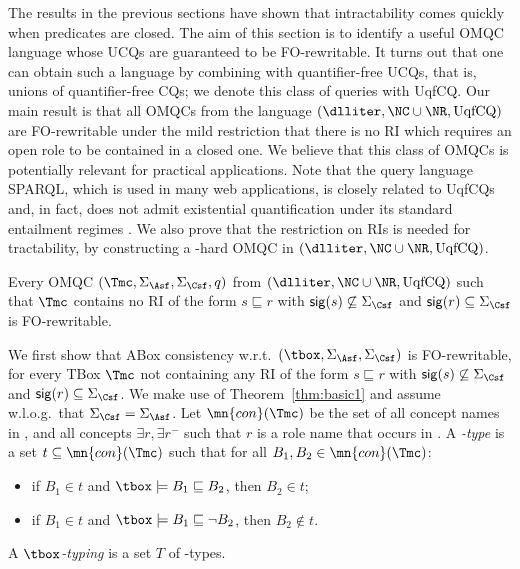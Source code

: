 \documentclass{lmcs}
\theoremstyle{definition}
\begin{document}
The results in the previous sections have shown that intractability
comes quickly when predicates are closed. The aim of this section is
to identify a useful OMQC language whose UCQs are guaranteed to be
FO-rewritable. It turns out that one can obtain such a language by
combining \dlliter with quantifier-free UCQs, that is, unions of
quantifier-free CQs; we denote this class of queries with UqfCQ. Our
main result is that all OMQCs from the language
$(\dlliter,\NC \cup \NR,\text{UqfCQ})$ are FO-rewritable under the
mild restriction that there is no RI which requires an open role to be
contained in a closed one. We believe that this class of OMQCs is
potentially relevant for practical applications. Note that the query
language SPARQL, which is used in many web applications, is closely
related to UqfCQs and, in fact, does not admit existential
quantification under its standard entailment regimes
\cite{DBLP:conf/semweb/GlimmK10}. We also prove that the restriction
on RIs is needed for tractability, by constructing a \conp-hard OMQC
in $(\dlliter,\NC \cup \NR,\text{UqfCQ})$.
%
\begin{thm}
  \label{thm:rewr}
  Every OMQC $(\Tmc,\Sigma_{\Asf},\Sigma_{\Csf},q)$ from
  $(\dlliter,\NC \cup \NR,\text{UqfCQ})$ such that
  $\Tmc$ contains no RI of the form $s \sqsubseteq r $
  with ${\sf sig}(s)\not\subseteq\Sigma_{\Csf}$ and ${\sf sig}(r)\subseteq \Sigma_{\Csf}$ is
  FO-rewritable.
\end{thm}
%
We first show that ABox consistency w.r.t.\ 
$(\tbox,\Sigma_{\Asf},\Sigma_{\Csf})$ is FO-rewritable, for every 
\dlliter TBox $\Tmc$ not containing any RI of the form $s \sqsubseteq r $
with ${\sf sig}(s)\not\subseteq\Sigma_{\Csf}$ and ${\sf sig}(r)\subseteq \Sigma_{\Csf}$.
We make use of Theorem~\ref{thm:basic1} and assume w.l.o.g.\ that 
$\Sigma_{\Csf}=\Sigma_{\Asf}$. 
Let $\mn{con}(\Tmc)$ be the set of all concept names in \Tmc, and all concepts 
$\exists r, \exists r^-$ such that $r$ is a 
role name that occurs in \Tmc.  A \emph{\Tmc-type} is a set $t 
\subseteq \mn{con}(\Tmc)$ such that for all $B_1,B_2 \in 
\mn{con}(\Tmc)$:
\begin{itemize}

\item if $B_1\in t$ and $\tbox\models B_1\sqsubseteq B_2$, then $B_2 \in t$;
\item if $B_1\in t$ and $\tbox\models B_1\sqsubseteq \neg B_2$, then $B_2\notin t$.

\end{itemize}
A \emph{$\tbox$-typing} is a set $T$ of \Tmc-types.  
\end{document}
